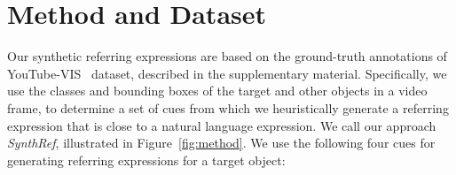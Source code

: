 \documentclass[11pt]{article}
\begin{document}
 




\section{Method and Dataset}
\label{sec:method}










Our synthetic referring expressions are based on the ground-truth annotations of YouTube-VIS~\citep{yang2019video} dataset, described in the supplementary material. Specifically, we use the classes and bounding boxes of the target and other objects in a video frame, to determine a set of cues 
from which we heuristically generate 
a referring expression that is close to a natural language expression. We call our approach 
\textit{SynthRef}, illustrated in Figure~\ref{fig:method}. 
We use the following four cues for generating referring expressions for a target object:


\begin{table*}[t!]
\caption{Statistics of our dataset and comparison to existing ones. The last two columns represent the average number of unique referring expressions per object and the average number of words per referring expression respectively.}
\label{table:statistics}
\end{table*}
\end{document}
